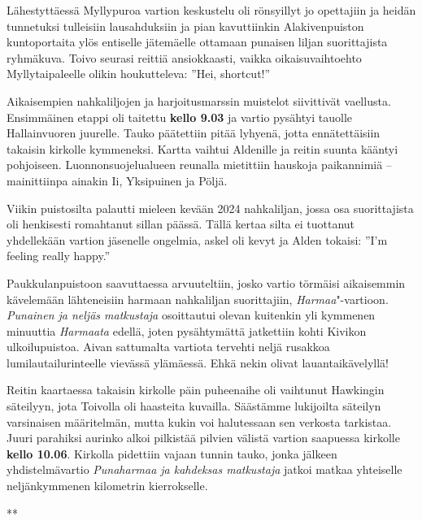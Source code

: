 \begin{multicols}{2}
Lähestyttäessä Myllypuroa vartion keskustelu oli rönsyillyt jo opettajiin 
ja heidän tunnetuksi tulleisiin lausahduksiin ja pian kavuttiinkin 
Alakivenpuiston kuntoportaita ylös entiselle jätemäelle ottamaan punaisen 
liljan suorittajista ryhmäkuva. Toivo seurasi reittiä ansiokkaasti, vaikka 
oikaisuvaihtoehto Myllytaipaleelle olikin houkutteleva: ''Hei, shortcut!''

Aikaisempien nahkaliljojen ja harjoitusmarssin muistelot siivittivät 
vaellusta. Ensimmäinen etappi oli taitettu \textbf{kello 9.03} ja vartio 
pysähtyi tauolle Hallainvuoren juurelle. Tauko päätettiin pitää lyhyenä, 
jotta ennätettäisiin takaisin kirkolle kymmeneksi. Kartta vaihtui Aldenille 
ja reitin suunta kääntyi pohjoiseen. Luonnonsuojelualueen reunalla mietittiin 
hauskoja paikannimiä -- mainittiinpa ainakin Ii, Yksipuinen ja Pöljä. 

Viikin puistosilta palautti mieleen kevään 2024 nahkaliljan, jossa osa 
suorittajista oli henkisesti romahtanut sillan päässä. Tällä kertaa silta 
ei tuottanut yhdellekään vartion jäsenelle ongelmia, askel oli kevyt ja 
Alden tokaisi: ''I'm feeling really happy.''

Paukkulanpuistoon saavuttaessa arvuuteltiin, josko vartio törmäisi 
aikaisemmin kävelemään lähteneisiin harmaan nahkaliljan suorittajiin, 
\textit{Harmaa}"-vartioon. \textit{Punainen ja neljäs matkustaja} osoittautui 
olevan kuitenkin yli kymmenen minuuttia \textit{Harmaata} edellä, joten 
pysähtymättä jatkettiin kohti Kivikon ulkoilupuistoa. Aivan sattumalta 
vartiota tervehti neljä rusakkoa lumilautailurinteelle vievässä 
ylämäessä. Ehkä nekin olivat lauantaikävelyllä!

Reitin kaartaessa takaisin kirkolle päin puheenaihe oli vaihtunut Hawkingin 
säteilyyn, jota Toivolla oli haasteita kuvailla. Säästämme lukijoilta 
säteilyn varsinaisen määritelmän, mutta kukin voi halutessaan sen verkosta 
tarkistaa. Juuri parahiksi aurinko alkoi pilkistää pilvien välistä vartion 
saapuessa kirkolle \textbf{kello 10.06}. Kirkolla pidettiin vajaan tunnin 
tauko, jonka jälkeen yhdistelmävartio \textit{Punaharmaa ja kahdeksas 
matkustaja} jatkoi matkaa yhteiselle neljänkymmenen kilometrin kierrokselle. 

{\noindent\centering ***\par}


\end{multicols}
